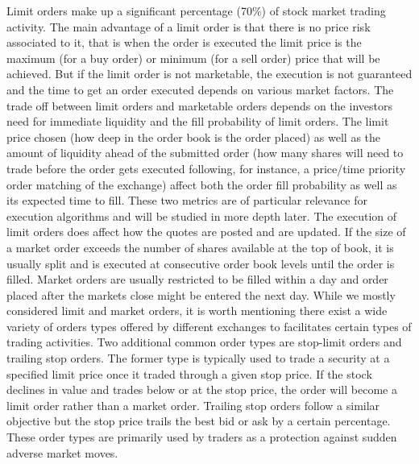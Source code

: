 Limit orders make up a significant percentage (70\%) of stock market trading activity. The main advantage of a limit order is that there is no price risk associated to it, that is when the order is executed the limit price is the maximum (for a buy order) or minimum (for a sell order) price that will be achieved. But if the limit order is not marketable, the execution is not guaranteed and the time to get an order executed depends on various market factors. 
The trade off between limit orders and marketable orders depends on the investors need for immediate liquidity and the fill probability of limit orders. The limit price chosen (how deep in the order book is the order placed) as well as the amount of liquidity ahead of the submitted order (how many shares will need to trade before the order gets executed following, for instance, a price/time priority order matching of the exchange) affect both the order fill probability as well as its expected time to fill. These two metrics are of particular relevance for execution algorithms and will be studied in more depth later. 
The execution of limit orders does affect how the quotes are posted and are updated.  
If the size of a market order exceeds the number of shares available at the top of book, it is usually split and is executed at consecutive order book levels until the order is filled. Market orders are usually restricted to be filled within a day and order placed after the markets close might be entered the next day. 
While we mostly considered limit and market orders, it is worth mentioning there exist a wide variety of orders types offered by different exchanges to facilitates certain types of trading activities. Two additional common order types are stop-limit orders and trailing stop orders. The former type is typically used to trade a security at a specified limit price once it traded through a given stop price. If the stock declines in value and trades below or at the stop price, the order will become a limit order rather than a market order. Trailing stop orders follow a similar objective but the stop price trails the best bid or ask by a certain percentage. These order types are primarily used by traders as a protection against sudden adverse market moves. \\

